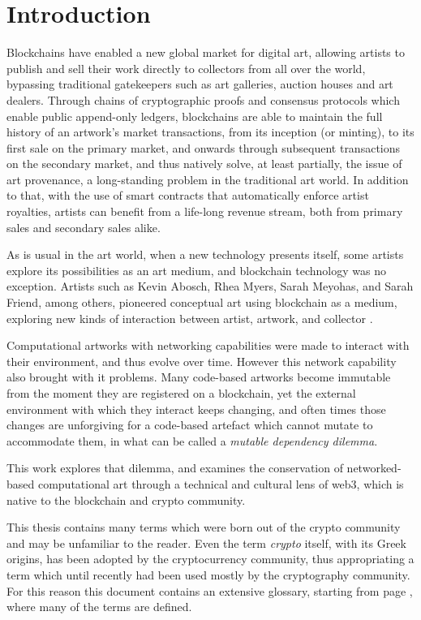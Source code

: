 \chapter{Introduction}
\label{chap:introduction}

Blockchains have enabled a new global market for digital art, allowing artists to publish and sell their work directly to collectors from all over the world, bypassing traditional gatekeepers such as art galleries, auction houses and art dealers. Through chains of cryptographic proofs and consensus protocols which enable public append-only ledgers, blockchains are able to maintain the full history of an artwork's market transactions, from its inception (or \gls{minting}), to its first sale on the \gls{primary market}, and onwards through subsequent transactions on the \gls{secondary market}, and thus natively solve, at least partially, the issue of art provenance, a long-standing problem in the traditional art world. In addition to that, with the use of smart contracts that automatically enforce artist royalties, artists can benefit from a life-long revenue stream, both from \gls{primary sales} and \gls{secondary sales} alike.

As is usual in the art world, when a new technology presents itself, some artists explore its possibilities as an art medium, and blockchain technology was no exception. Artists such as Kevin Abosch, Rhea Myers, Sarah Meyohas, and Sarah Friend, among others, pioneered \gls{conceptual art} using blockchain as a medium, exploring new kinds of interaction between artist, artwork, and collector \cite{rcsBlockchainMedium2022}.

Computational artworks with networking capabilities were made to interact with their environment, and thus evolve over time. However this network capability also brought with it problems. Many code-based artworks become immutable from the moment they are registered on a blockchain, yet the external environment with which they interact keeps changing, and often times those changes are unforgiving for a code-based artefact which cannot mutate to accommodate them, in what can be called a \emph{mutable dependency dilemma}.

This work explores that dilemma, and examines the conservation of networked-based computational art through a technical and cultural lens of \gls{web3}, which is native to the blockchain and crypto community.

This thesis contains many terms which were born out of the crypto community and may be unfamiliar to the reader. Even the term \emph{crypto} itself, with its Greek origins, has been adopted by the cryptocurrency community, thus appropriating a term which until recently had been used mostly by the cryptography community. For this reason this document contains an extensive glossary, starting from page \pageref{sec:glossary}, where many of the terms are defined.

